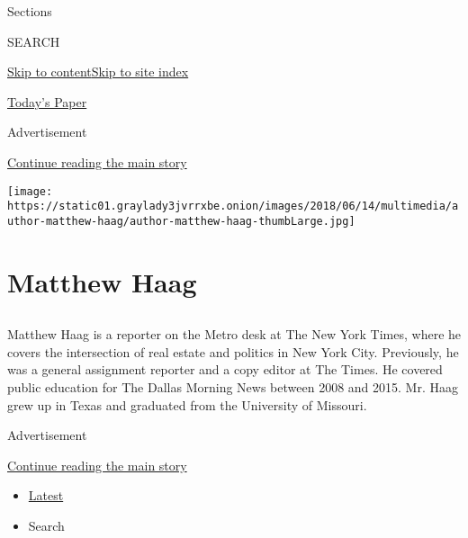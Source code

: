 Sections

SEARCH

\protect\hyperlink{site-content}{Skip to
content}\protect\hyperlink{site-index}{Skip to site index}

\href{https://myaccount.nytimes3xbfgragh.onion/auth/login?response_type=cookie\&client_id=vi}{}

\href{https://www.nytimes3xbfgragh.onion/section/todayspaper}{Today's
Paper}

Advertisement

\protect\hyperlink{after-top}{Continue reading the main story}

\texttt{[image: https://static01.graylady3jvrrxbe.onion/images/2018/06/14/multimedia/author-matthew-haag/author-matthew-haag-thumbLarge.jpg]}

\hypertarget{matthew-haag}{%
\section{Matthew Haag}\label{matthew-haag}}

\subsection{}

Matthew Haag is a reporter on the Metro desk at The New York Times,
where he covers the intersection of real estate and politics in New York
City. Previously, he was a general assignment reporter and a copy editor
at The Times. He covered public education for The Dallas Morning News
between 2008 and 2015. Mr. Haag grew up in Texas and graduated from the
University of Missouri.

Advertisement

\protect\hyperlink{after-mid1}{Continue reading the main story}

\begin{itemize}
\tightlist
\item
  \protect\hyperlink{stream-panel}{Latest}
\item
  Search
\end{itemize}

